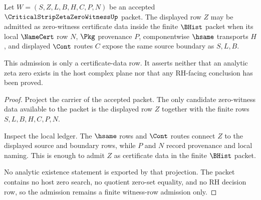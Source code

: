 \begin{theorem}
\label{thm:critical-strip-zeta-zero-witness-zero-row-admission}
Let $W=(S,Z,L,B,H,C,P,N)$ be an accepted $\CriticalStripZetaZeroWitnessUp$ packet. The displayed row $Z$ may be admitted as zero-witness certificate data inside the finite $\BHist$ packet when its local $\NameCert$ row $N$, $\Pkg$ provenance $P$, componentwise $\hsame$ transports $H$, and displayed $\Cont$ routes $C$ expose the same source boundary as $S,L,B$.

This admission is only a certificate-data row. It asserts neither that an analytic zeta zero exists in the host complex plane nor that any RH-facing conclusion has been proved.
\end{theorem}
\begin{proof}
Project the carrier of the accepted packet. The only candidate zero-witness data available to the packet is the displayed row $Z$ together with the finite rows $S,L,B,H,C,P,N$.

Inspect the local ledger. The $\hsame$ rows and $\Cont$ routes connect $Z$ to the displayed source and boundary rows, while $P$ and $N$ record provenance and local naming. This is enough to admit $Z$ as certificate data in the finite $\BHist$ packet.

No analytic existence statement is exported by that projection. The packet contains no host zero search, no quotient zero-set equality, and no RH decision row, so the admission remains a finite witness-row admission only.
\end{proof}

